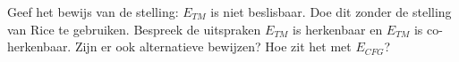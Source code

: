 \begin{question}
	Geef het bewijs van de stelling: $E_{TM}$ is niet beslisbaar. Doe dit zonder de stelling van Rice te gebruiken. Bespreek de uitspraken $E_{TM}$ is herkenbaar en $E_{TM}$ is co-herkenbaar. Zijn er ook alternatieve bewijzen? Hoe zit het met $E_{CFG}$?
\end{question}

\lipsum[1-2]